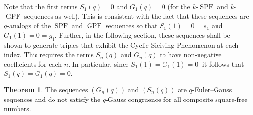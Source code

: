 \documentclass{article}
\numberwithin{equation}{section}
\theoremstyle{definition}
\newtheorem{theorem}[definition]{\bf {Theorem}}
\begin{document}
Note that the first terms $S_1(q)=0$ and $G_1(q)=0$ (for the $k$-$\operatorname{SPF}$ and $k$-$\operatorname{GPF}$ sequences as well). This is consistent with the fact that these sequences are $q$-analogs of the $\operatorname{SPF}$ and $\operatorname{GPF}$ sequences so that $S_1(1)=0=s_1$ and $G_1(1)=0=g_1$. Further, in the following section, these sequences shall be shown to generate triples that exhibit the Cyclic Sieiving Phenomenon at each index. This requires the terms $S_n(q)$ and $G_n(q)$ to have non-negative coefficients for each $n$. In particular, since $S_1(1)=G_1(1)=0$, it follows that $S_1(q)=G_1(q)=0$.
\begin{theorem}
     The sequences $(G_n(q))$ and $(S_n(q))$ are $q$-Euler--Gauss sequences and do not satisfy the $q$-Gauss congruence for all composite square-free numbers. 
\end{theorem}
\end{document}
